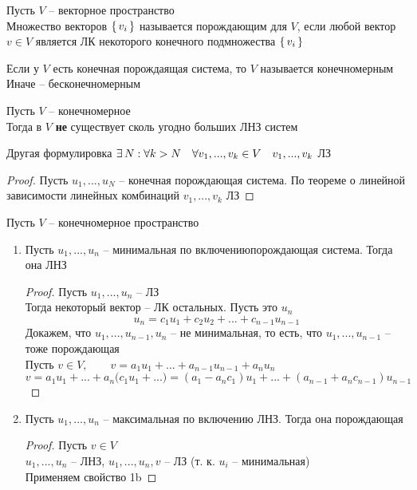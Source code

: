 \begin{definition}
    Пусть $V$ -- векторное пространство \\
    Множество векторов $ \set{v_i}$ называется порождающим для $V$, если любой вектор $v \in V$ является ЛК некоторого конечного подмножества $\set{v_i}$
\end{definition}

\begin{definition}
	Если у $V$ есть конечная порождаящая система, то $V$ называется конечномерным \\
    Иначе -- бесконечномерным
\end{definition}

\begin{property}
	Пусть $V$ -- конечномерное \\
    Тогда в $V$ \textbf{не} существует сколь угодно больших ЛНЗ систем
\end{property}

\begin{undefthm}{Другая формулировка}
	$ \exists\, N : \forall k > N \quad \forall v_1, ..., v_k \in V \quad v_1, ..., v_k$ ЛЗ
\end{undefthm}

\begin{proof}
	Пусть $u_1, ..., u_N$ -- конечная порождающая система. По теореме о линейной зависимости линейных комбинаций $v_1, ..., v_k$ ЛЗ
\end{proof}

\begin{theorem}
	Пусть $V$ -- конечномерное пространство
    \begin{enumerate}
		\item Пусть $u_1, ..., u_n$ -- минимальная по включению\footnotemark порождающая система. Тогда она ЛНЗ
        \begin{proof}
        	Пусть $u_1, ..., u_n$ -- ЛЗ \\
            Тогда некоторый вектор -- ЛК остальных. Пусть это $u_n$
            $$ u_n = c_1u_1 + c_2u_2 + ... + c_{n - 1}u_{n - 1} $$
            Докажем, что $u_1, ..., u_{n - 1}, u_n$ -- не минимальная, то есть, что $u_1, ..., u_{n - 1}$ -- тоже порождающая \\
            Пусть $v \in V, \qquad v = a_1u_1 + ... + a_{n - 1}u_{n - 1} + a_nu_n $
            $$ v = a_1u_1 + ... + a_n \bigg( c_1u_1 + ... \bigg) = (a_1 - a_nc_1)u_1 + ... + (a_{n - 1} + a_nc_{n - 1})u_{n - 1} $$
        \end{proof}
        \item Пусть $u_1, ..., u_n$ -- максимальная по включению ЛНЗ. Тогда она порождающая
        \begin{proof}
        	Пусть $v \in V$ \\
            $u_1, ..., u_n$ -- ЛНЗ, $u_1, ..., u_n, v$ -- ЛЗ (т. к. $u_i$ -- минимальная) \\
            Применяем свойство 1b
        \end{proof}
    \end{enumerate}
\end{theorem}

